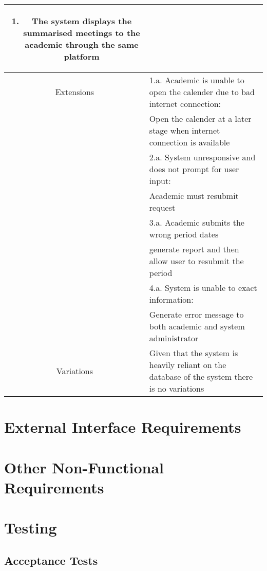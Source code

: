 \documentclass[11pt, a4paper]{article}
\begin{document}
\begin{table}[t]
\begin{tabular}{| c | p{10cm} |}
\begin{enumerate}
				\item The system displays the summarised meetings to the academic through the same platform
			\end{enumerate}
			\\ 
			\hline
			Extensions & 1.a. Academic is unable to open the calender due to bad internet connection: \\
			& Open the calender at a later stage when internet connection is available\\
			& 2.a. System unresponsive and does not prompt for user input: \\
			& Academic must resubmit request \\
			& 3.a. Academic submits the wrong period dates \\
			& generate report and then allow user to resubmit the period \\
			& 4.a. System is unable to exact information: \\
			& Generate error message to both academic and system administrator\\
			\hline
			Variations & Given that the system is heavily reliant on the database of the system there is no variations\\
			\hline
		\end{tabular}
	\end{table}
	
	\section{External Interface Requirements}

	
	\section{Other Non-Functional Requirements}
	

	\section{Testing}
	\subsection{Acceptance Tests}
	
	
\end{document}
